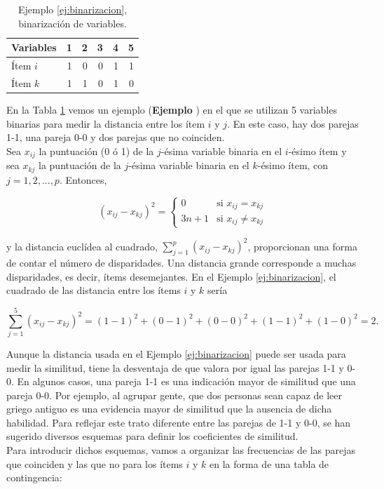 \documentclass[a4paper, 20pt]{article}
\newcounter{EJCounter}
\newcommand{\ej}[1]{\refstepcounter{EJCounter}\textbf{\rmfamily Ejemplo \theEJCounter}\label{#1}}
\begin{document}
\begin{table}[H]
  \caption{Ejemplo \ref{ej:binarizacion}, binarización de variables.}
  \label{tab:binarizacion}
\centering
  \begin{tabular}{lrrrrr}
    \toprule
  Variables    & 1    & 2    & 3   & 4   & 5   \\
  \midrule
Ítem $i$ & 1    & 0    & 0   & 1   & 1   \\
Ítem $k$ & 1    & 1    & 0   & 1   & 0\\
\bottomrule
\end{tabular}
\end{table}

En la Tabla \ref{tab:binarizacion} vemos un ejemplo (\ej{ej:binarizacion}) en el que se utilizan 5 variables binarias para medir la distancia entre los ítem $i$ y $j$. En este caso, hay dos parejas 1-1, una pareja 0-0 y dos parejas que no coinciden.\\

Sea $x_{ij}$ la puntuación (0 ó 1) de la $j$-ésima variable binaria en el $i$-ésimo ítem y sea $x_{kj}$ la puntuación de la $j$-ésima variable binaria en el $k$-ésimo ítem, con $j=1,2,...,p$. Entonces,

$$(x_{ij}-x_{kj})^2 = \left \{ \begin{matrix} 0 & \mbox{si } x_{ij}=x_{kj}
\\ 3n+1 & \mbox{si }x_{ij}\neq x_{kj}\end{matrix}\right.   $$

y la distancia euclídea al cuadrado, $\sum_{j=1}^p{(x_{ij}-x_{kj})^2}$, proporcionan una forma de contar el número de disparidades. Una distancia grande corresponde a muchas disparidades, es decir, ítems desemejantes. En el Ejemplo \ref{ej:binarizacion}, el cuadrado de las distancia entre los ítems $i$ y $k$ sería

$$\sum_{j=1}^5{(x_{ij}-x_{kj})^2}=(1-1)^2+(0-1)^2+(0-0)^2+(1-1)^2+(1-0)^2=2.$$

Aunque la distancia usada en el Ejemplo \ref{ej:binarizacion} puede ser usada para medir la similitud, tiene la desventaja de que valora por igual las parejas 1-1 y 0-0. En algunos casos, una pareja 1-1 es una indicación mayor de similitud que una pareja 0-0. Por ejemplo, al agrupar gente, que dos personas sean capaz de leer griego antiguo es una evidencia mayor de similitud que la ausencia de dicha habilidad. Para reflejar este trato diferente entre las parejas de 1-1 y 0-0, se han sugerido diversos esquemas para definir los coeficientes de similitud.\\
Para introducir dichos esquemas, vamos a organizar las frecuencias de las parejas que coinciden y las que no para los ítems $i$ y $k$ en la forma de una tabla de contingencia:
\end{document}
